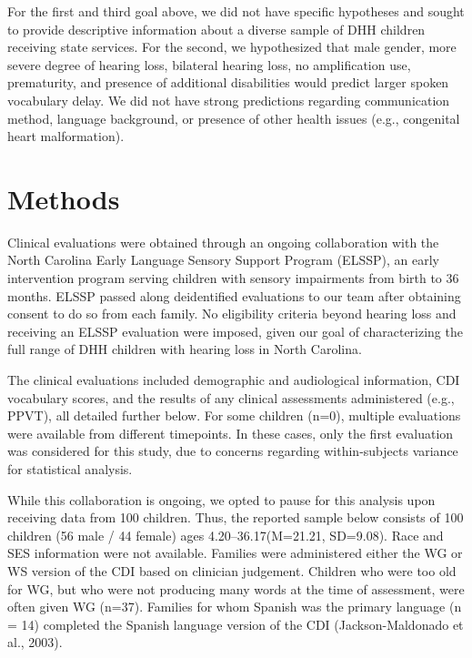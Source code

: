 \documentclass[english,man]{apa6}
\begin{document}
For the first and third goal above, we did not have specific hypotheses and sought to provide descriptive information about a diverse sample of DHH children receiving state services. For the second, we hypothesized that male gender, more severe degree of hearing loss, bilateral hearing loss, no amplification use, prematurity, and presence of additional disabilities would predict larger spoken vocabulary delay. We did not have strong predictions regarding communication method, language background, or presence of other health issues (e.g., congenital heart malformation).

\hypertarget{methods}{%
\section{Methods}\label{methods}}

Clinical evaluations were obtained through an ongoing collaboration with the North Carolina Early Language Sensory Support Program (ELSSP), an early intervention program serving children with sensory impairments from birth to 36 months. ELSSP passed along deidentified evaluations to our team after obtaining consent to do so from each family. No eligibility criteria beyond hearing loss and receiving an ELSSP evaluation were imposed, given our goal of characterizing the full range of DHH children with hearing loss in North Carolina.

The clinical evaluations included demographic and audiological information, CDI vocabulary scores, and the results of any clinical assessments administered (e.g., PPVT), all detailed further below. For some children (n=0), multiple evaluations were available from different timepoints. In these cases, only the first evaluation was considered for this study, due to concerns regarding within-subjects variance for statistical analysis.

While this collaboration is ongoing, we opted to pause for this analysis upon receiving data from 100 children. Thus, the reported sample below consists of 100 children (56 male / 44 female) ages 4.20--36.17(M=21.21, SD=9.08). Race and SES information were not available. Families were administered either the WG or WS version of the CDI based on clinician judgement. Children who were too old for WG, but who were not producing many words at the time of assessment, were often given WG (n=37). Families for whom Spanish was the primary language (n = 14) completed the Spanish language version of the CDI (Jackson-Maldonado et al., 2003).
\end{document}
